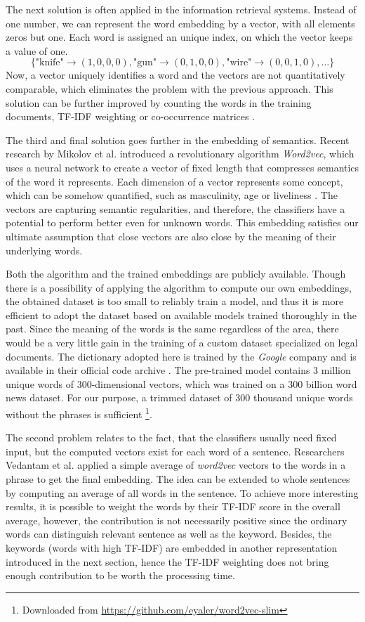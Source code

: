 \documentclass[
  digital, %
  notable,   %
  nolof,     %
  nolot,     %
]{fithesis3}
\begin{document}
The next solution is often applied in the information retrieval systems.
Instead of one number, we can represent the word embedding by a vector, with all elements zeros but one.
Each word is assigned an unique index, on which the vector keeps a value of one.
$$
\{\text{"knife"} \rightarrow (1,0,0,0), \text{"gun"} \rightarrow (0,1,0,0), \text{"wire"} \rightarrow (0,0,1,0), \dots\}
$$
Now, a vector uniquely identifies a word and the vectors are not quantitatively comparable, which eliminates the problem with the previous approach.
This solution can be further improved by counting the words in the training documents, TF-IDF weighting or co-occurrence matrices \cite{wordEmbeddings}.

The third and final solution goes further in the embedding of semantics.
Recent research by Mikolov et al. \cite{mikolov2013efficient} introduced a revolutionary algorithm \textit{Word2vec}, which uses a neural network to create a vector of fixed length that compresses semantics of the word it represents.
Each dimension of a vector represents some concept, which can be somehow quantified, such as masculinity, age or liveliness \cite{mikolov2013linguistic}.
The vectors are capturing semantic regularities, and therefore, the classifiers have a potential to perform better even for unknown words.
This embedding satisfies our ultimate assumption that close vectors are also close by the meaning of their underlying words.

Both the algorithm and the trained embeddings are publicly available.
Though there is a possibility of applying the algorithm to compute our own embeddings, the obtained dataset is too small to reliably train a model, and thus it is more efficient to adopt the dataset based on available models trained thoroughly in the past.
Since the meaning of the words is the same regardless of the area, there would be a very little gain in the training of a custom dataset specialized on legal documents.
The dictionary adopted here is trained by the \textit{Google} company and is available in their official code archive \cite{word2vecGoogle}.
The pre-trained model contains 3 million unique words of 300-dimensional vectors, which was trained on a 300 billion word news dataset.
For our purpose, a trimmed dataset of 300 thousand unique words without the phrases is sufficient \footnote{Downloaded from \url{https://github.com/eyaler/word2vec-slim}}.

The second problem relates to the fact, that the classifiers usually need fixed input, but the computed vectors exist for each word of a sentence.
Researchers Vedantam et al. \cite{vedantam2015learning} applied a simple average of \textit{word2vec} vectors to the words in a phrase to get the final embedding.
The idea can be extended to whole sentences by computing an average of all words in the sentence.
To achieve more interesting results, it is possible to weight the words by their TF-IDF score in the overall average, however, the contribution is not necessarily positive since the ordinary words can distinguish relevant sentence as well as the keyword.
Besides, the keywords (words with high TF-IDF) are embedded in another representation introduced in the next section, hence the TF-IDF weighting does not bring enough contribution to be worth the processing time.
\end{document}
